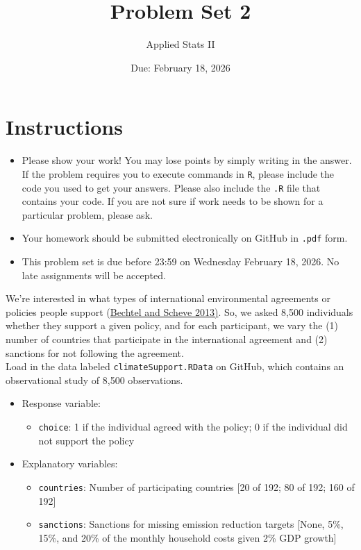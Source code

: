 \documentclass[12pt,letterpaper]{article}
\title{Problem Set 2}
\date{Due: February 18, 2026}
\author{Applied Stats II}
\begin{document}
	\maketitle
	\section*{Instructions}
	\begin{itemize}
		\item Please show your work! You may lose points by simply writing in the answer. If the problem requires you to execute commands in \texttt{R}, please include the code you used to get your answers. Please also include the \texttt{.R} file that contains your code. If you are not sure if work needs to be shown for a particular problem, please ask.
		\item Your homework should be submitted electronically on GitHub in \texttt{.pdf} form.
		\item This problem set is due before 23:59 on Wednesday February 18, 2026. No late assignments will be accepted.
		
	\end{itemize}
	
	\vspace{.25cm}
	
	\noindent We're interested in what types of international environmental agreements or policies people support (\href{https://www.pnas.org/content/110/34/13763}{Bechtel and Scheve 2013)}. So, we asked 8,500 individuals whether they support a given policy, and for each participant, we vary the (1) number of countries that participate in the international agreement and (2) sanctions for not following the agreement. \\
	
	\noindent Load in the data labeled \texttt{climateSupport.RData} on GitHub, which contains an observational study of 8,500 observations.
	
	\begin{itemize}
		\item
		Response variable: 
		\begin{itemize}
			\item \texttt{choice}: 1 if the individual agreed with the policy; 0 if the individual did not support the policy
		\end{itemize}
		\item
		Explanatory variables: 
		\begin{itemize}
			\item
			\texttt{countries}: Number of participating countries [20 of 192; 80 of 192; 160 of 192]
			\item
			\texttt{sanctions}: Sanctions for missing emission reduction targets [None, 5\%, 15\%, and 20\% of the monthly household costs given 2\% GDP growth]
			
		\end{itemize}
		
	\end{itemize}
	
\end{document}
